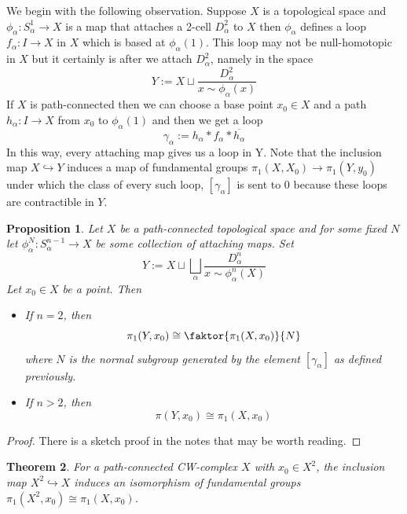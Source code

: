 \documentclass[11pt]{article}
\newcommand{\defeq}{:=}
\newtheorem{theorem}{Theorem}[section]
\newtheorem{prop}[theorem]{Proposition}
\begin{document}
We begin with the following observation.
Suppose $X$ is a topological space and $\phi_\alpha:S^1_\alpha \to X$ is a map that attaches a 2-cell $D_\alpha^2$ to $X$ then $\phi_\alpha$ defines a loop $f_\alpha:I \to X$ in $X$ which is based at $\phi_\alpha(1)$.
This loop may not be null-homotopic in $X$ but it certainly is after we attach $D_\alpha^2$, namely in the space
\[
	Y\defeq X\sqcup\frac{D_\alpha^2}{x\sim\phi_\alpha(x)}
\]
If $X$ is path-connected then we can choose a base point $x_0\in X$ and a path $h_\alpha:I \to X$ from $x_0$ to $\phi_\alpha(1)$ and then we get a loop
\[
	\gamma_\alpha\defeq h_\alpha \ast f_\alpha \ast \overline{h_\alpha}
\]
In this way, every attaching map gives us a loop in Y.
Note that the inclusion map $X \hookrightarrow Y$ induces a map of fundamental groups $\pi_1(X, X_0)\to\pi_1(Y, y_0)$ under which the class of every such loop, $\left[\gamma_\alpha\right]$ is sent to $0$ because these loops are contractible in $Y$.

\begin{prop}
Let $X$ be a path-connected topological space and for some fixed $N$ let $\phi_\alpha^N:S_\alpha^{n-1}\to X$ be some collection of attaching maps.
Set
\[
	Y\defeq X\sqcup\bigsqcup_\alpha\frac{D_\alpha^n}{x\sim \phi_\alpha^n (X)}
\]
Let $x_0\in X$ be a point.
Then
\begin{itemize}
	\item If $n=2$, then
		\[
			\pi_1(Y, x_0)\cong \faktor{\pi_1(X,x_0)}{N}
		\]
		where $N$ is the normal subgroup generated by the element $\left[\gamma_\alpha\right]$ as defined previously.
	\item If $n>2$, then
		\[
			\pi(Y, x_0)\cong \pi_1(X, x_0)
		\]
\end{itemize}
\end{prop}

\begin{proof}
There is a sketch proof in the notes that may be worth reading.
\end{proof}

\begin{theorem}
For a path-connected CW-complex $X$ with $x_0\in X^2$, the inclusion map $X^2\hookrightarrow X$ induces an isomorphism of fundamental groups $\pi_1(X^2, x_0)\cong \pi_1(X, x_0)$.
\end{theorem}
\end{document}
